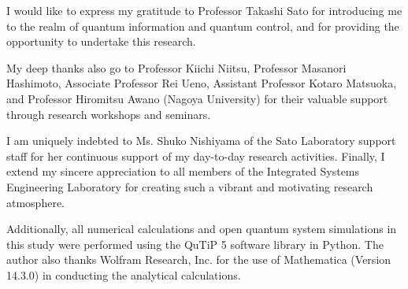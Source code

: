 \acknowledgments
I would like to express my gratitude to Professor Takashi Sato for introducing me to the realm of quantum
information and quantum control, and for providing the opportunity to undertake this research.

My deep thanks also go to Professor Kiichi Niitsu, Professor Masanori Hashimoto, Associate Professor
Rei Ueno, Assistant Professor Kotaro Matsuoka, and Professor Hiromitsu Awano (Nagoya University) for their valuable
support through research workshops and seminars.

I am uniquely indebted to Ms. Shuko Nishiyama of the Sato Laboratory support staff for her
continuous support of my day-to-day research activities. Finally, I extend my  sincere appreciation to all members of
the Integrated Systems Engineering Laboratory for creating such a vibrant and motivating research atmosphere.

Additionally, all numerical calculations and open quantum system simulations in this study were performed using the
QuTiP 5 software library in Python. The author also thanks Wolfram Research, Inc. for the use of Mathematica (Version
14.3.0) in conducting the analytical calculations.
